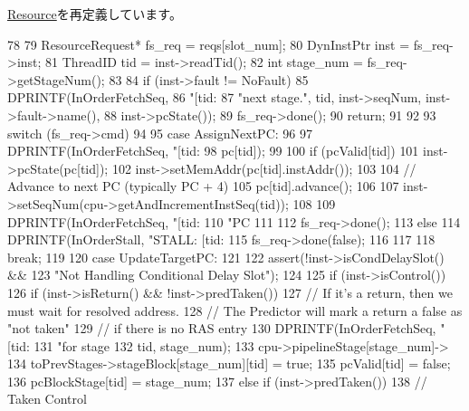 \hyperlink{classResource_a39af49c5568d1db3f53c12d7d6914c32}{Resource}を再定義しています。


\begin{DoxyCode}
78 {
79     ResourceRequest* fs_req = reqs[slot_num];
80     DynInstPtr inst = fs_req->inst;
81     ThreadID tid = inst->readTid();
82     int stage_num = fs_req->getStageNum();
83 
84     if (inst->fault != NoFault) {
85         DPRINTF(InOrderFetchSeq,
86                 "[tid:%
87                 "next stage.\n", tid, inst->seqNum, inst->fault->name(),
88                 inst->pcState());
89         fs_req->done();
90         return;
91     }
92 
93     switch (fs_req->cmd)
94     {
95       case AssignNextPC:
96         {
97             DPRINTF(InOrderFetchSeq, "[tid:%
98                     pc[tid]);
99 
100             if (pcValid[tid]) {
101                 inst->pcState(pc[tid]);
102                 inst->setMemAddr(pc[tid].instAddr());
103 
104                 // Advance to next PC (typically PC + 4)
105                 pc[tid].advance();
106 
107                 inst->setSeqNum(cpu->getAndIncrementInstSeq(tid));
108 
109                 DPRINTF(InOrderFetchSeq, "[tid:%
110                         "PC %
111 
112                 fs_req->done();
113             } else {
114                 DPRINTF(InOrderStall, "STALL: [tid:%
115                 fs_req->done(false);
116             }
117         }
118         break;
119 
120       case UpdateTargetPC:
121         {
122             assert(!inst->isCondDelaySlot()  &&
123                    "Not Handling Conditional Delay Slot");
124 
125             if (inst->isControl()) {
126                 if (inst->isReturn() && !inst->predTaken()) {
127                     // If it's a return, then we must wait for resolved address.
128                     // The Predictor will mark a return a false as "not taken"
129                     // if there is no RAS entry
130                     DPRINTF(InOrderFetchSeq, "[tid:%
131                             "for stage %
132                             tid, stage_num);
133                     cpu->pipelineStage[stage_num]->
134                         toPrevStages->stageBlock[stage_num][tid] = true;
135                     pcValid[tid] = false;
136                     pcBlockStage[tid] = stage_num;
137                 } else if (inst->predTaken()) {
138                     // Taken Control
}}}}}
\end{DoxyCode}
